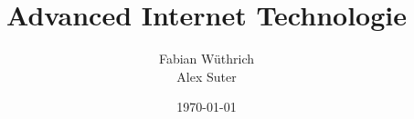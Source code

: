 \titlehead{Hochschule Luzern \\ 
	Technik \& Architektur}
\subject{Zusammenfassung}
\title{Advanced Internet Technologie}
\subtitle{}
\author{Fabian Wüthrich \\
	Alex Suter}
\date{\today}

\maketitle